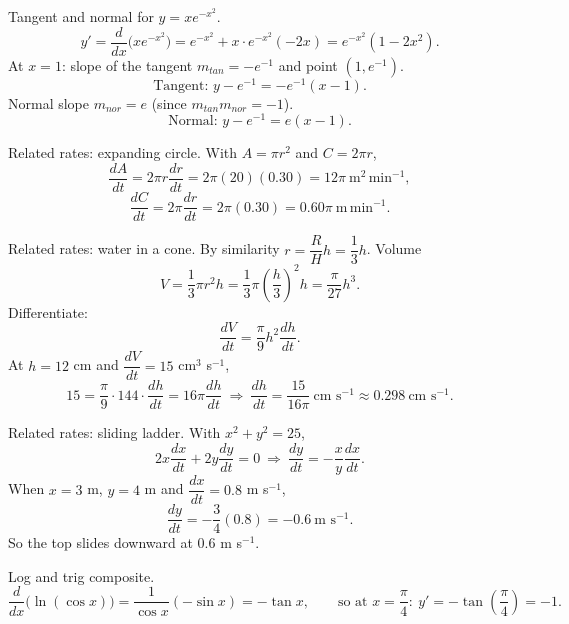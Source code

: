 \documentclass[11pt]{article}
\def\textbf#1{#1}%
\def\mathrm#1{#1}%
\begin{document}
\begin{solution}
\textbf{Tangent and normal for $y=xe^{-x^{2}}$.}
\[
y'=\frac{d}{dx}\big(xe^{-x^{2}}\big)=e^{-x^{2}}+x\cdot e^{-x^{2}}(-2x)=e^{-x^{2}}(1-2x^{2}).
\]
At $x=1$: slope of the tangent $m_{\mathrm{tan}}=-e^{-1}$ and point $(1,e^{-1})$.
\[
\text{Tangent: } y-e^{-1}=-e^{-1}(x-1).
\]
Normal slope $m_{\mathrm{nor}}=e$ (since $m_{\mathrm{tan}}m_{\mathrm{nor}}=-1$).
\[
\text{Normal: } y-e^{-1}=e(x-1).
\]
\end{solution}

\begin{solution}
\textbf{Related rates: expanding circle.} With $A=\pi r^{2}$ and $C=2\pi r$,
\[
\frac{dA}{dt}=2\pi r\frac{dr}{dt}=2\pi(20)(0.30)=12\pi\ \text{m}^{2}\,\text{min}^{-1},
\]
\[
\frac{dC}{dt}=2\pi\frac{dr}{dt}=2\pi(0.30)=0.60\pi\ \text{m}\,\text{min}^{-1}.
\]
\end{solution}

\begin{solution}
\textbf{Related rates: water in a cone.} By similarity $r=\dfrac{R}{H}h=\dfrac{1}{3}h$. Volume
\[
V=\frac{1}{3}\pi r^{2}h=\frac{1}{3}\pi\left(\frac{h}{3}\right)^{2}h=\frac{\pi}{27}h^{3}.
\]
Differentiate:
\[
\frac{dV}{dt}=\frac{\pi}{9}h^{2}\frac{dh}{dt}.
\]
At $h=12$ cm and $\dfrac{dV}{dt}=15$ cm$^{3}$ s$^{-1}$,
\[
15=\frac{\pi}{9}\cdot 144\cdot \frac{dh}{dt}=16\pi\frac{dh}{dt}
\ \Rightarrow\ 
\frac{dh}{dt}=\frac{15}{16\pi}\ \text{cm s}^{-1}\approx 0.298\ \text{cm s}^{-1}.
\]
\end{solution}

\begin{solution}
\textbf{Related rates: sliding ladder.} With $x^{2}+y^{2}=25$,
\[
2x\frac{dx}{dt}+2y\frac{dy}{dt}=0\ \Rightarrow\ \frac{dy}{dt}=-\frac{x}{y}\frac{dx}{dt}.
\]
When $x=3$ m, $y=4$ m and $\dfrac{dx}{dt}=0.8$ m s$^{-1}$,
\[
\frac{dy}{dt}=-\frac{3}{4}(0.8)=-0.6\ \text{m s}^{-1}.
\]
So the top slides downward at $0.6$ m s$^{-1}$.
\end{solution}

\begin{solution}
\textbf{Log and trig composite.}
\[
\frac{d}{dx}\big(\ln(\cos x)\big)=\frac{1}{\cos x}(-\sin x)=-\tan x,
\qquad
\text{so at }x=\frac{\pi}{4}:\ y'=-\tan\!\left(\frac{\pi}{4}\right)=-1.
\]
\end{solution}
\end{document}
